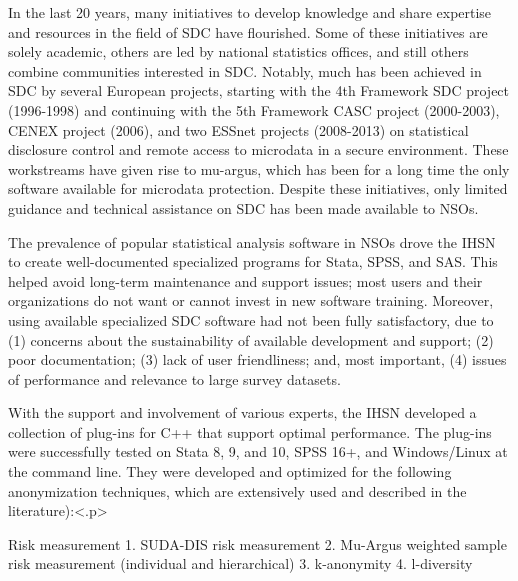 \documentclass[SDCmaster.tex]{subfiles}
\begin{document}
\begin{frame}
In the last 20 years, many initiatives to develop knowledge and share expertise and resources in the field of SDC have flourished. Some of these initiatives are solely academic, others are led by national statistics offices, and still others combine communities interested in SDC. Notably, much has been achieved in SDC by several European projects, starting with the 4th Framework SDC project (1996-1998) and continuing with the 5th Framework CASC project (2000-2003), CENEX project (2006), and two ESSnet projects (2008-2013) on statistical disclosure control and remote access to microdata in a secure environment. These workstreams have given rise to mu-argus, which has been for a long time the only software available for microdata protection. Despite these initiatives, only limited guidance and technical assistance on SDC has been made available to NSOs.
\end{frame}

\begin{frame}
The prevalence of popular statistical analysis software in NSOs drove the IHSN to create well-documented specialized programs for Stata, SPSS, and SAS. This helped avoid long-term maintenance and support issues; most users and their organizations do not want or cannot invest in new software training. Moreover, using available specialized SDC software had not been fully satisfactory, due to (1) concerns about the sustainability of available development and support; (2) poor documentation; (3) lack of user friendliness; and, most important, (4) issues of performance and relevance to large survey datasets.
\end{frame}

\begin{frame}
With the support and involvement of various experts, the IHSN developed a collection of plug-ins for C++ that support optimal performance. The plug-ins were successfully tested on Stata 8, 9, and 10, SPSS 16+, and Windows/Linux at the command line. They were developed and optimized for the following anonymization techniques, which are extensively used and described in the literature):<.p>
\end{frame}

\begin{frame}
Risk measurement
1.	SUDA-DIS risk measurement
2.	Mu-Argus weighted sample risk measurement (individual and hierarchical)
3.	k-anonymity
4.	l-diversity
\end{frame}
\end{document}
